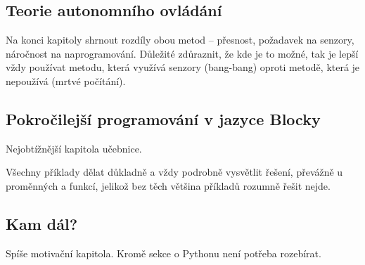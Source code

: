 \subsection{Teorie autonomního ovládání}
Na konci kapitoly shrnout rozdíly obou metod -- přesnost, požadavek na senzory, náročnost na naprogramování. Důležité zdůraznit, že kde je to možné, tak je lepší vždy používat metodu, která využívá senzory (bang-bang) oproti metodě, která je nepoužívá (mrtvé počítání).

\subsection{Pokročilejší programování v jazyce Blocky}
Nejobtížnější kapitola učebnice.

Všechny příklady dělat důkladně a vždy podrobně vysvětlit řešení, převážně u proměnných a funkcí, jelikož bez těch většina příkladů rozumně řešit nejde.

\subsection{Kam dál?}
Spíše motivační kapitola. Kromě sekce o Pythonu není potřeba rozebírat.

\newpage

\nocite{*}
\printbibliography[title={Seznam použitých a doporučených zdrojů}]


